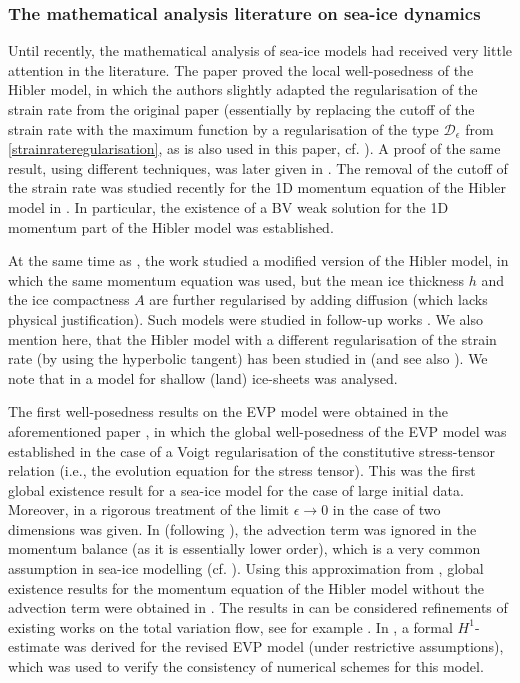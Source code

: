 \documentclass[12pt,a4paper]{article}
\theoremstyle{definition}
\theoremstyle{remark}
\numberwithin{equation}{section}
\begin{document}
\subsubsection{The mathematical analysis literature on sea-ice dynamics}
Until recently, the mathematical analysis of sea-ice models had received very little attention in the literature. The paper \cite{liu} proved the local well-posedness of the Hibler model, in which the authors slightly adapted the regularisation of the strain rate from the original paper \cite{hibler} (essentially by replacing the cutoff of the strain rate with the maximum function by a regularisation of the type $\mathcal{D}_\epsilon$ from \eqref{strainrateregularisation}, as is also used in this paper, cf. \cite{kreyscher}). A proof of the same result, using different techniques, was later given in \cite{brandt2025}. The removal of the cutoff of the strain rate was studied recently for the 1D momentum equation of the Hibler model in \cite{liu2026}. In particular, the existence of a BV weak solution for the 1D momentum part of the Hibler model was established.

At the same time as \cite{liu}, the work \cite{brandt} studied a modified version of the Hibler model, in which the same momentum equation was used, but the mean ice thickness $h$ and the ice compactness $A$ are further regularised by adding diffusion (which lacks physical justification). Such models were studied in follow-up works \cite{binz2022,binz2024,brandt2023}. We also mention here, that the Hibler model with a different regularisation of the strain rate (by using the hyperbolic tangent) has been studied in \cite{chatta} (and see also \cite{chatta2025}). We note that in \cite{piersanti} a model for shallow (land) ice-sheets was analysed.

The first well-posedness results on the EVP model were obtained in the aforementioned paper \cite{boutros2025}, in which the global well-posedness of the EVP model was established in the case of a Voigt regularisation of the constitutive stress-tensor relation (i.e., the evolution equation for the stress tensor). This was the first global existence result for a sea-ice model for the case of large initial data. Moreover, in \cite{boutros2025} a rigorous treatment of the limit $\epsilon \rightarrow 0$ in the case of two dimensions was given. In \cite{boutros2025} (following \cite{hunke}), the advection term was ignored in the momentum balance (as it is essentially lower order), which is a very common assumption in sea-ice modelling (cf. \cite{lepparanta}). Using this approximation from \cite{hunke,boutros2025}, global existence results for the momentum equation of the Hibler model without the advection term were obtained in \cite{dingel,denk}. The results in \cite{dingel,denk} can be considered refinements of existing works on the total variation flow, see for example \cite{giga2001,giga2010,andreu2001,andreu2001minimizing,bellettini}. In \cite{mehlmann}, a formal $H^1$-estimate was derived for the revised EVP model (under restrictive assumptions), which was used to verify the consistency of numerical schemes for this model. 
\end{document}
